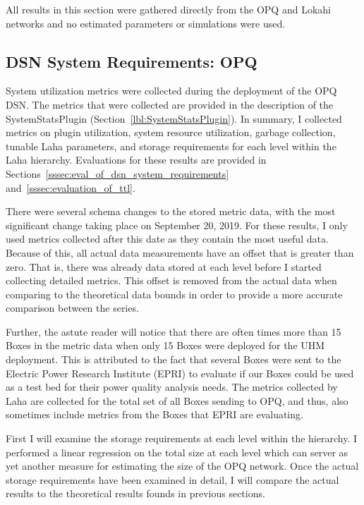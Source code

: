 All results in this section were gathered directly from the OPQ and Lokahi networks and no estimated parameters or simulations were used.

\subsection{DSN System Requirements: OPQ}\label{subsec:dsn-system-requirements:-opq}

System utilization metrics were collected during the deployment of the OPQ DSN. The metrics that were collected are provided in the description of the SystemStatsPlugin (Section~\ref{lbl:SystemStatsPlugin}). In summary, I collected metrics on plugin utilization, system resource utilization, garbage collection, tunable Laha parameters, and storage requirements for each level within the Laha hierarchy. Evaluations for these results are provided in Sections~\ref{sssec:eval_of_dsn_system_requirements} and~\ref{sssec:evaluation_of_ttl}.

There were several schema changes to the stored metric data, with the most significant change taking place on September 20, 2019. For these results, I only used metrics collected after this date as they contain the most useful data. Because of this, all actual data measurements have an offset that is greater than zero. That is, there was already data stored at each level before I started collecting detailed metrics. This offset is removed from the actual data when comparing to the theoretical data bounds in order to provide a more accurate comparison between the series.

Further, the astute reader will notice that there are often times more than 15 Boxes in the metric data when only 15 Boxes were deployed for the UHM deployment. This is attributed to the fact that several Boxes were sent to the Electric Power Research Institute (EPRI) to evaluate if our Boxes could be used as a test bed for their power quality analysis needs. The metrics collected by Laha are collected for the total set of all Boxes sending to OPQ, and thus, also sometimes include metrics from the Boxes that EPRI are evaluating.

First I will examine the storage requirements at each level within the hierarchy. I performed a linear regression on the total size at each level which can server as yet another measure for estimating the size of the OPQ network. Once the actual storage requirements have been examined in detail, I will compare the actual results to the theoretical results founds in previous sections.

